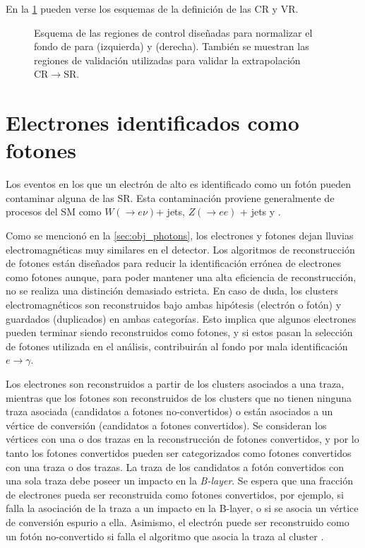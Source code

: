En la \cref{fig:bkg_crq} pueden verse los esquemas de la definición de las CR y VR.

\begin{figure}[!htbp]
  \centering

  \resizebox{0.49\textwidth}{!}{}
  \resizebox{0.49\textwidth}{!}{}

  \caption{Esquema de las regiones de control diseñadas para normalizar el fondo
    de {\gjet} para {\SRL} (izquierda) y {\SRH} (derecha). También se muestran
    las regiones de validación utilizadas para validar la extrapolación
    $\mathrm{CR}\to\mathrm{SR}$.}
  \label{fig:bkg_crq}
\end{figure}



\section{Electrones identificados como fotones} \label{sec:efakes}

Los eventos en los que un electrón de alto {\pt} es identificado como un
fotón \cite{Bocci:1643300} pueden contaminar alguna de las SR. Esta contaminación
proviene generalmente de procesos del SM como $W(\to e\nu)$+ jets, $Z(\to ee)$ +
jets y {\ttbar}.

Como se mencionó en la \cref{sec:obj_photons}, los electrones y fotones dejan
lluvias electromagnéticas muy similares en el detector. Los algoritmos de
reconstrucción de fotones están diseñados para reducir la identificación errónea
de electrones como fotones aunque, para poder mantener una alta eficiencia de
reconstrucción, no se realiza una distinción demasiado estricta. En caso de
duda, los clusters electromagnéticos son reconstruidos bajo ambas hipótesis
(electrón o fotón) y guardados (duplicados) en ambas categorías. Esto implica
que algunos electrones pueden terminar siendo reconstruidos como fotones, y si
estos pasan la selección de fotones utilizada en el análisis, contribuirán al
fondo por mala identificación $e\to\gamma$.

Los electrones son reconstruidos a partir de los clusters asociados a una traza,
mientras que los fotones son reconstruidos de los clusters que no tienen ninguna
traza asociada (candidatos a fotones no-convertidos) o están asociados a un
vértice de conversión (candidatos a fotones convertidos). Se consideran los
vértices con una o dos trazas en la reconstrucción de fotones convertidos, y por
lo tanto los fotones convertidos pueden ser categorizados como fotones
convertidos con una traza o dos trazas. La traza de los candidatos a fotón
convertidos con una sola traza debe poseer un impacto en la \emph{B-layer}. Se
espera que una fracción de electrones pueda ser reconstruida como fotones
convertidos, por ejemplo, si falla la asociación de la traza a un impacto en la
B-layer, o si se asocia un vértice de conversión espurio a ella. Asimismo, el
electrón puede ser reconstruido como un fotón no-convertido si falla el
algoritmo que asocia la traza al cluster .

